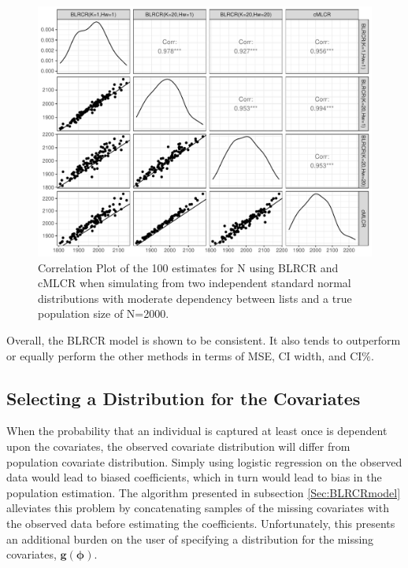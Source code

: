\documentclass[
  12pt,
]{article}
\begin{document}
\begin{figure}[H]

{\centering \includegraphics{dissertationmain_files/figure-latex/plotNvalues-1} 

}

\caption{\label{fig:normalx} Correlation Plot of the 100 estimates for N using BLRCR and cMLCR when simulating from two independent standard normal distributions with moderate dependency between lists and a true population size of N=2000.}\label{fig:plotNvalues}
\end{figure}

Overall, the BLRCR model is shown to be consistent. It also tends to
outperform or equally perform the other methods in terms of MSE, CI
width, and CI\(\%\).

\subsection{Selecting a Distribution for the Covariates}
\label{Sec:selectcovariates}

When the probability that an individual is captured at least once is
dependent upon the covariates, the observed covariate distribution will
differ from population covariate distribution. Simply using logistic
regression on the observed data would lead to biased coefficients, which
in turn would lead to bias in the population estimation. The algorithm
presented in subsection \ref{Sec:BLRCRmodel} alleviates this problem by
concatenating samples of the missing covariates with the observed data
before estimating the coefficients. Unfortunately, this presents an
additional burden on the user of specifying a distribution for the
missing covariates, \(\boldsymbol{g}(\boldsymbol{\phi})\).
\end{document}

